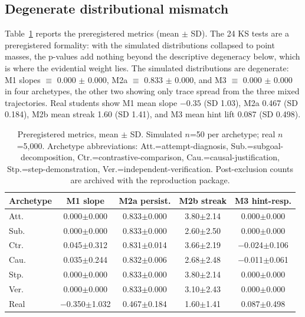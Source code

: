 \documentclass[notitlepage,12pt]{jedm}
\begin{document}
\subsection{Degenerate distributional mismatch}
\label{sec:res-ks}

Table~\ref{tab:metrics} reports the preregistered metrics (mean $\pm$ SD).
The 24 KS tests are a preregistered formality: with the simulated
distributions collapsed to point masses, the p-values add nothing beyond
the descriptive degeneracy below, which is where the evidential weight
lies. The simulated distributions are degenerate: M1 slopes $\equiv$ 0.000
$\pm$ 0.000, M2a $\equiv$ 0.833 $\pm$ 0.000, and M3 $\equiv$ 0.000 $\pm$
0.000 in four archetypes, the other two showing only trace spread from
the three mixed trajectories. Real students show M1 mean slope $-0.35$
(SD 1.03), M2a 0.467 (SD 0.184), M2b mean streak 1.60 (SD 1.41), and M3
mean hint lift 0.087 (SD 0.498).

\begin{table}[t]
\centering
\caption{Preregistered metrics, mean $\pm$ SD. Simulated
$n$=50 per archetype; real $n$=5{,}000. Archetype abbreviations:
Att.=attempt-diagnosis, Sub.=subgoal-decomposition, Ctr.=contrastive-comparison,
Cau.=causal-justification, Stp.=step-demonstration, Ver.=independent-verification.
Post-exclusion counts are archived with the reproduction package.}
\label{tab:metrics}
\begin{tabular}{lcccc}
\toprule
Archetype & M1 slope & M2a persist. & M2b streak & M3 hint-resp. \\
\midrule
Att. & 0.000$\pm$0.000 & 0.833$\pm$0.000 & 3.80$\pm$2.14 & 0.000$\pm$0.000 \\
Sub. & 0.000$\pm$0.000 & 0.833$\pm$0.000 & 2.60$\pm$2.50 & 0.000$\pm$0.000 \\
Ctr. & 0.045$\pm$0.312 & 0.831$\pm$0.014 & 3.66$\pm$2.19 & $-$0.024$\pm$0.106 \\
Cau. & 0.035$\pm$0.244 & 0.832$\pm$0.006 & 2.68$\pm$2.48 & $-$0.011$\pm$0.061 \\
Stp. & 0.000$\pm$0.000 & 0.833$\pm$0.000 & 3.80$\pm$2.14 & 0.000$\pm$0.000 \\
Ver. & 0.000$\pm$0.000 & 0.833$\pm$0.000 & 3.10$\pm$2.43 & 0.000$\pm$0.000 \\
Real & $-$0.350$\pm$1.032 & 0.467$\pm$0.184 & 1.60$\pm$1.41 & 0.087$\pm$0.498 \\
\bottomrule
\end{tabular}
\end{table}
\end{document}
